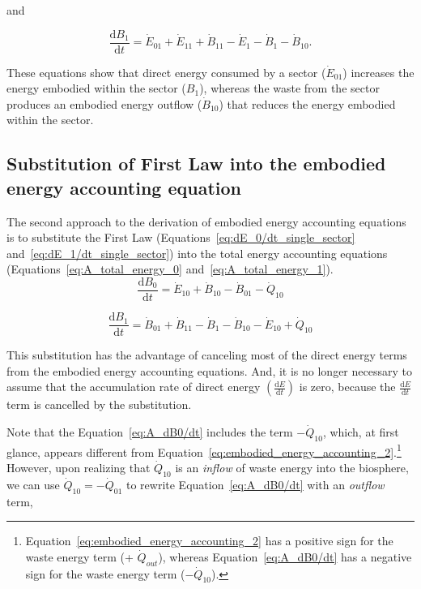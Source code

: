 \noindent and

\begin{equation} \label{eq:A_total_energy_1_simp}
	\frac{\mathrm{d}B_{1}}{\mathrm{d}t} 
	= \dot{E}_{01} 
	+ \dot{E}_{11}
	+ \dot{B}_{11}
	- \dot{E}_{1}
	- \dot{B}_{1}
	- \dot{B}_{10}.	
\end{equation}

These equations show that direct energy consumed by a 
sector ($\dot{E}_{01}$) increases the energy embodied within the sector ($B_1$), 
whereas the waste from the sector produces an embodied
energy outflow ($\dot{B}_{10}$) that reduces 
the energy embodied within the sector. 



\subsection{Substitution of First Law into the embodied energy accounting equation} %
\label{subsec:A_first_law_embodied}

The second approach to the derivation of embodied energy
accounting equations is to substitute the First Law
(Equations~\ref{eq:dE_0/dt_single_sector} and~\ref{eq:dE_1/dt_single_sector}) 
into the total energy accounting equations 
(Equations~\ref{eq:A_total_energy_0} and~\ref{eq:A_total_energy_1}). 
\begin{equation} \label{eq:A_dB0/dt}
	\frac{\mathrm{d}B_{0}}{\mathrm{d}t} 
	= \dot{E}_{10}
	+ \dot{B}_{10} 
	- \dot{B}_{01}
	- \dot{Q}_{10}
\end{equation}

\begin{equation} \label{eq:A_dB1/dt}
	\frac{\mathrm{d}B_{1}}{\mathrm{d}t} 
	= \dot{B}_{01} 
	+ \dot{B}_{11}
	- \dot{B}_{1}
	- \dot{B}_{10}
	- \dot{E}_{10}
	+ \dot{Q}_{10}
\end{equation}

This substitution has the advantage of canceling most 
of the direct energy terms from the embodied energy accounting equations.
And, it is no longer necessary to assume that the 
accumulation rate of direct energy 
$\left( \frac{\mathrm{d}E}{\mathrm{d}t} \right)$
is zero, because the 
$\frac{\mathrm{d}E}{\mathrm{d}t}$
term is cancelled by the substitution.

Note that the Equation~\ref{eq:A_dB0/dt} includes the
term $-\dot{Q}_{10}$, which, at first glance,
appears different from 
Equation~\ref{eq:embodied_energy_accounting_2}.\footnote{Equation~\ref{eq:embodied_energy_accounting_2}
has a positive sign for the waste energy term (+ $\dot{Q}_{out}$),
whereas Equation~\ref{eq:A_dB0/dt} has a 
negative sign for the waste energy term ($- \dot{Q}_{10}$).}
However, upon realizing that $\dot{Q}_{10}$ is an \emph{inflow}
of waste energy into the biosphere, we can use $\dot{Q}_{10} = - \dot{Q}_{01}$
to rewrite Equation~\ref{eq:A_dB0/dt} with an \emph{outflow} 
term,

